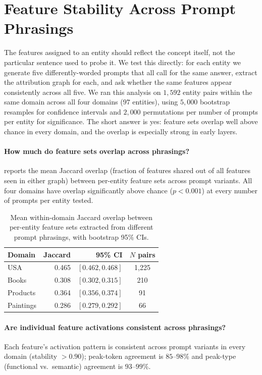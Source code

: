 \section{Feature Stability Across Prompt Phrasings}
\label{appx:crossprompt}

The features assigned to an entity should reflect the concept itself, not the particular sentence used to probe it. We test this directly: for each entity we generate five differently-worded prompts that all call for the same answer, extract the attribution graph for each, and ask whether the same features appear consistently across all five. We ran this analysis on $1{,}592$ entity pairs within the same domain across all four domains ($97$ entities), using $5{,}000$ bootstrap resamples for confidence intervals and $2{,}000$ permutations per number of prompts per entity for significance. The short answer is yes: feature sets overlap well above chance in every domain, and the overlap is especially strong in early layers.

\paragraph{How much do feature sets overlap across phrasings?}
 reports the mean Jaccard overlap (fraction of features shared out of all features seen in either graph) between per-entity feature sets across prompt variants. All four domains have overlap significantly above chance ($p<0.001$) at every number of prompts per entity tested.

\begin{table}[h]
\centering\small
\begin{tabular}{lrrc}
\toprule
Domain    & Jaccard & 95\% CI & $N$ pairs \\
\midrule
USA       & 0.465 & $[0.462, 0.468]$ & 1{,}225 \\
Books     & 0.308 & $[0.302, 0.315]$ &   210 \\
Products  & 0.364 & $[0.356, 0.374]$ &    91 \\
Paintings & 0.286 & $[0.279, 0.292]$ &    66 \\
\bottomrule
\end{tabular}
\caption{Mean within-domain Jaccard overlap between per-entity feature sets extracted from different prompt phrasings, with bootstrap 95\% CIs.}
\label{tab:jaccard}
\end{table}

\paragraph{Are individual feature activations consistent across phrasings?}
Each feature's activation pattern is consistent across prompt variants in every domain (stability $>0.90$); peak-token agreement is $85$--$98\%$ and peak-type (functional vs.\ semantic) agreement is $93$--$99\%$.

